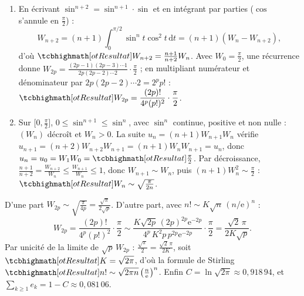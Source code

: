 \begin{corrigeEval}{}{}
\begin{questions}[start=8]
  \item \begin{enumerate}[label=\alph*)]
      \item En écrivant $\sin^{n+2}=\sin^{n+1}\cdot\sin$ et en intégrant par
        parties ($\cos$ s'annule en $\frac\pi2$) :
        \[W_{n+2}=(n+1)\int_0^{\pi/2}\sin^{n}t\cos^{2}t\,\mathrm{d}t=(n+1)(W_n-W_{n+2}),\]
        d'où $\res{W_{n+2}=\frac{n+1}{n+2}W_n}$. Avec $W_0=\frac\pi2$, une
        récurrence donne
        $W_{2p}=\frac{(2p-1)(2p-3)\cdots1}{2p(2p-2)\cdots2}\cdot\frac\pi2$ ;
        en multipliant numérateur et dénominateur par
        $2p(2p-2)\cdots2=2^{p}p!$ :
        $\res{W_{2p}=\dfrac{(2p)!}{4^{p}(p!)^{2}}\cdot\dfrac\pi2}$.
      \item Sur $\bigl[0,\frac\pi2\bigr]$, $0\leqslant\sin^{n+1}\leqslant\sin^{n}$,
        avec $\sin^{n}$ continue, positive et non nulle : $(W_n)$ décroît et
        $W_n>0$. La suite $u_n=(n+1)W_{n+1}W_n$ vérifie
        $u_{n+1}=(n+2)W_{n+2}W_{n+1}=(n+1)W_nW_{n+1}=u_n$, donc
        $u_n=u_0=W_1W_0=\res{\frac\pi2}$. Par décroissance,
        $\frac{n+1}{n+2}=\frac{W_{n+2}}{W_n}\leqslant\frac{W_{n+1}}{W_n}\leqslant1$,
        donc $W_{n+1}\sim W_n$, puis $(n+1)W_n^{2}\sim\frac\pi2$ :
        $\res{W_n\sim\sqrt{\tfrac{\pi}{2n}}}$.
    \end{enumerate}
  \item D'une part $W_{2p}\sim\sqrt{\frac{\pi}{4p}}=\frac{\sqrt\pi}{2\sqrt p}$.
    D'autre part, avec $n!\sim K\sqrt n\,(n/\mathrm{e})^{n}$ :
    \[W_{2p}=\frac{(2p)!}{4^{p}(p!)^{2}}\cdot\frac\pi2
      \sim\frac{K\sqrt{2p}\,(2p)^{2p}\mathrm{e}^{-2p}}{4^{p}\,K^{2}p\,p^{2p}\mathrm{e}^{-2p}}\cdot\frac\pi2
      =\frac{\sqrt2\,\pi}{2K\sqrt p}.\]
    Par unicité de la limite de $\sqrt p\,W_{2p}$ :
    $\frac{\sqrt\pi}{2}=\frac{\sqrt2\,\pi}{2K}$, soit $\res{K=\sqrt{2\pi}}$,
    d'où la formule de Stirling
    $\res{n!\sim\sqrt{2\pi n}\,\bigl(\tfrac n{\mathrm{e}}\bigr)^{n}}$. Enfin
    $C=\ln\sqrt{2\pi}\approx0{,}918\,94$, et $\sum_{k\geqslant1}e_k=1-C\approx0{,}081\,06$.
\end{questions}
\begin{center}\begin{minipage}{\linewidth}\centering
{}
\end{minipage}
\end{center}
\end{corrigeEval}
